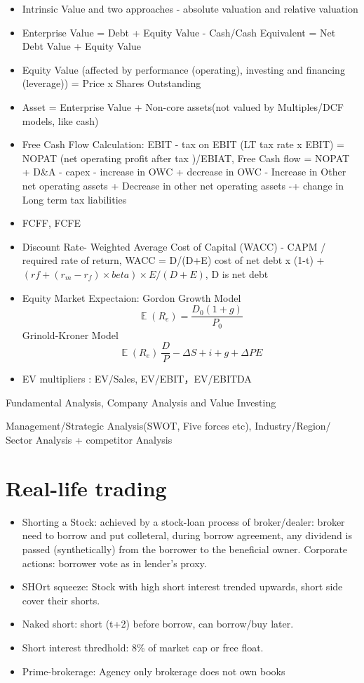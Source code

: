 \documentclass[11pt, openany]{book}              %
\DeclareMathOperator{\E}{\mathbb{E}}
\begin{document}
\begin{itemize}
	\item Intrinsic Value and two approaches - absolute valuation and relative valuation 
	\item Enterprise Value = Debt + Equity Value - Cash/Cash Equivalent = Net Debt Value + Equity Value
	\item Equity Value (affected by performance (operating), investing and financing (leverage)) = Price x Shares Outstanding
	\item Asset = Enterprise Value + Non-core assets(not valued by Multiples/DCF models, like cash)
	\item Free Cash Flow Calculation: EBIT - tax on EBIT (LT tax rate x EBIT) = NOPAT (net operating profit after tax )/EBIAT, Free Cash flow = NOPAT + D\&A - capex - increase in OWC + decrease in OWC - Increase in Other net operating assets + Decrease in other net operating assets -+ change in Long term tax liabilities
	\item FCFF, FCFE 
	\item Discount Rate- Weighted Average Cost of Capital (WACC) - CAPM / required rate of return, WACC = D/(D+E) cost of net debt x (1-t) + $(rf+(r_m-r_f)\times beta)\times E/(D+E)$, D is net debt
	\item Equity Market Expectaion: Gordon Growth Model
	$$ \E(R_e) = \frac{D_0(1+g)}{P_0}$$
	Grinold-Kroner Model
	$$ \E(R_e) \ \frac{D}{P} - \Delta S + i + g + \Delta PE$$
	\item EV multipliers : EV/Sales, EV/EBIT，EV/EBITDA
\end{itemize}


Fundamental Analysis, Company Analysis and Value Investing

Management/Strategic Analysis(SWOT, Five forces etc), Industry/Region/ Sector Analysis + competitor Analysis 

\section{ Real-life trading}

\begin{itemize}
    \item Shorting a Stock: achieved by a stock-loan process of broker/dealer: broker need to borrow and put colleteral, during borrow agreement, any dividend is passed (synthetically) from the borrower to the beneficial owner. Corporate actions: borrower vote as in lender's proxy. 
    \item SHOrt squeeze: Stock with high short interest trended upwards, short side cover their shorts.
    \item Naked short: short (t+2) before borrow, can borrow/buy later.
    \item Short interest thredhold: 8\% of market cap or free float.
    \item Prime-brokerage: Agency only brokerage does not own books
\end{itemize}
\end{document}

